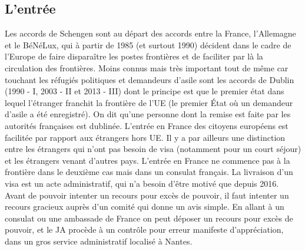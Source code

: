 \documentclass[math]{cours}
\begin{document}
\subsection{L'entrée}
Les accords de Schengen sont au départ des accords entre la France, l'Allemagne et le BéNéLux, qui à partir de 1985 (et surtout 1990) décident dans le cadre de l'Europe de faire disparaître les postes frontières et de faciliter par là la circulation des frontières.
Moins connus mais très important tout de même car touchant les réfugiés politiques et demandeurs d'asile sont les accords de Dublin (1990 - I, 2003 - II et 2013 - III) dont le principe est que le premier état dans lequel l'étranger franchit la frontière de l'UE (le premier État où un demandeur d'asile a été enregistré).
On dit qu'une personne dont la remise est faite par les autorités françaises est dublinée.
L'entrée en France des citoyens européens est facilitée par rapport aux étrangers hors UE.
Il y a par ailleurs une distinction entre les étrangers qui n'ont pas besoin de visa (notamment pour un court séjour) et les étrangers venant d'autres pays.
L'entrée en France ne commence pas à la frontière dans le deuxième cas mais dans un consulat français.
La livraison d'un visa est un acte administratif, qui n'a besoin d'être motivé que depuis 2016.
Avant de pouvoir intenter un recours pour excès de pouvoir, il faut intenter un recours gracieux auprès d'un comité qui donne un avis simple.
En allant à un consulat ou une ambassade de France on peut déposer un recours pour excès de pouvoir, et le JA procède à un contrôle pour erreur manifeste d'appréciation, dans un gros service administratif localisé à Nantes.
\end{document}
